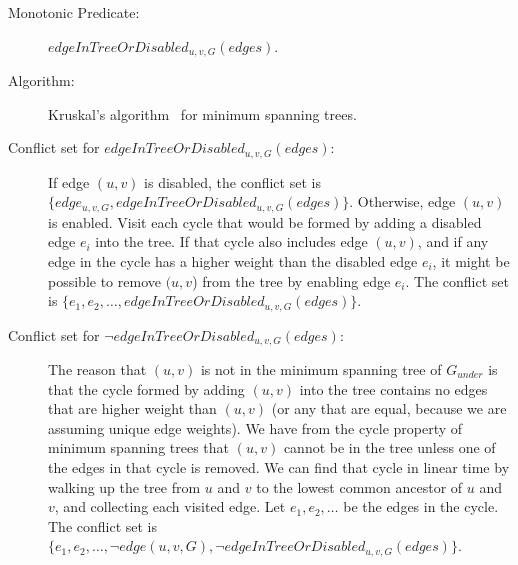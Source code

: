 \documentclass[runningheads]{llncs}
\newcommand{\gunder}{G_{under}}
\begin{document}
\begin{description}
\item[Monotonic Predicate:] $edgeInTreeOrDisabled_{u,v,G}(edges)$.
\item[Algorithm:] Kruskal's algorithm~\cite{kruskal1956shortest} for minimum spanning trees.
\item[Conflict set for $edgeInTreeOrDisabled_{u,v,G}(edges)$:] If edge $(u,v)$ is disabled, the conflict set is $\{edge_{u,v,G}, edgeInTreeOrDisabled_{u,v,G}(edges)\}$. 
Otherwise, edge $(u,v)$ is enabled. Visit each cycle that would be formed by adding a disabled edge $e_i$ into the tree. If that cycle also includes edge $(u,v)$, and if any edge in the cycle has a higher weight than the disabled edge $e_i$, it might be possible to remove $(u,v$) from the tree by enabling edge $e_i$. The conflict set is $\{e_1, e_2, \ldots, edgeInTreeOrDisabled_{u,v,G}(edges)\}$.

\item[Conflict set for $\lnot edgeInTreeOrDisabled_{u,v,G}(edges)$:] The reason that $(u,v)$ is not in the minimum spanning tree of $\gunder$ is that the cycle formed by adding $(u,v)$ into the tree contains no edges that are higher weight than $(u,v)$ (or any that are equal, because we are assuming unique edge weights). We have from the cycle property of minimum spanning trees that $(u,v)$ cannot be in the tree unless one of the edges in that cycle is removed. We can find that cycle in linear time by walking up the tree from $u$ and $v$ to the lowest common ancestor of $u$ and $v$, and collecting each visited edge. Let $e_1, e_2,\ldots$ be the edges in the cycle. The conflict set is  $\{e_1, e_2,\ldots, \lnot edge(u,v,G),\lnot edgeInTreeOrDisabled_{u,v,G}(edges)\}$.
\end{description}
 
\end{document}
